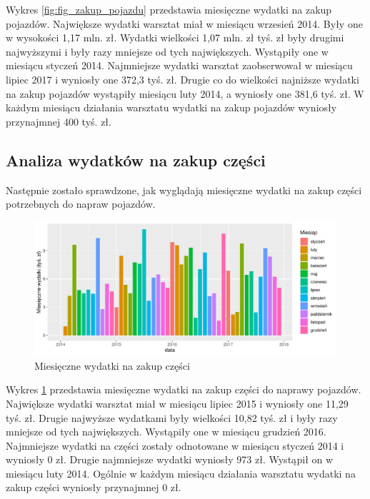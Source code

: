 \documentclass{article}\usepackage[]{graphicx}\usepackage[]{xcolor}
\makeatletter
\def\maxwidth{ %
  \ifdim\Gin@nat@width>\linewidth
    \linewidth
  \else
    \Gin@nat@width
  \fi
}
\newenvironment{knitrout}{}{} %
\makeatother
\begin{document}
Wykres \ref{fig:fig_zakup_pojazdu} przedstawia miesięczne wydatki na zakup pojazdów. 
Największe wydatki warsztat miał w miesiącu wrzesień 2014. Były one w wysokości 1,17 mln. zł. 
Wydatki wielkości 1,07 mln. zł tyś. zł były drugimi najwyższymi i były  razy mniejsze od tych największych. Wystąpiły one w miesiącu styczeń 2014.
Najmniejsze wydatki warsztat zaobserwował w miesiącu lipiec 2017 i wyniosły one 372,3 tyś. zł. 
Drugie co do wielkości najniższe wydatki na zakup pojazdów wystąpiły miesiącu luty 2014, a wyniosły one 381,6 tyś. zł.
W każdym miesiącu działania warsztatu wydatki na zakup pojazdów wyniosły przynajmnej 400 tyś. zł.

\subsection{Analiza wydatków na zakup części}

Następnie zostało sprawdzone, jak wyglądają miesięczne wydatki na zakup części potrzebnych do napraw pojazdów.

\begin{knitrout}
\color{fgcolor}\begin{figure}[H]

{\centering \includegraphics[width=\maxwidth]{figure/fig_zakup_czesci-1} 

}

\caption[Miesięczne wydatki na zakup części]{Miesięczne wydatki na zakup części}\label{fig:fig_zakup_czesci}
\end{figure}

\end{knitrout}

Wykres \ref{fig:fig_zakup_czesci} przedstawia miesięczne wydatki na zakup części do naprawy pojazdów.
Największe wydatki warsztat miał w miesiącu lipiec 2015 i wyniosły one 11,29 tyś. zł. 
Drugie najwyższe wydatkami były wielkości 10,82 tyś. zł i były  razy mniejsze od tych największych. Wystąpiły one w miesiącu grudzień 2016.
Najmniejsze wydatki na części zostały odnotowane w miesiącu styczeń 2014 i wyniosły 0 zł. 
Drugie najmniejsze wydatki wyniosły 973 zł. Wystąpił on w miesiącu luty 2014.
Ogólnie w każdym miesiącu działania warsztatu wydatki na zakup części wyniosły przynajmnej 0 zł.
\end{document}
